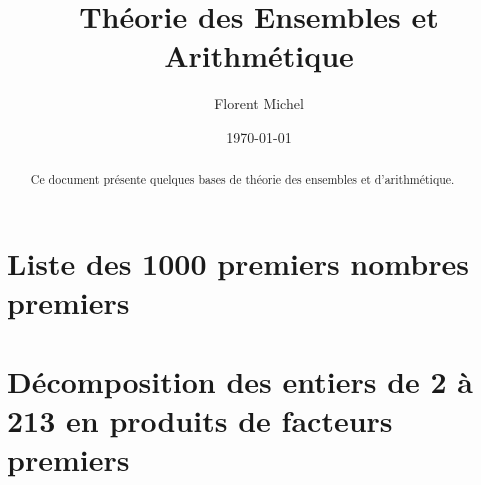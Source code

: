 
\usepackage{splitidx}
\newcommand{\aindex}[1]{#1\index{#1}} %
\makeindex
{}
 
\title{Théorie des Ensembles et Arithmétique}
\date{\today}
\author{%
Florent Michel \\ 
\Fstar} 

\newcommand{\inbox}[1]{\begin{tikzpicture}[baseline=-0.7ex, inner sep=0.5ex] \node[draw] {#1\vphantom{0123456789}}; \end{tikzpicture}}

 
\date{}
\maketitle 
\begin{abstract}
Ce document présente quelques bases de théorie des ensembles et d'arithmétique.
\end{abstract}
\bigskip
\renewcommand{\contentsname}{Table des matières}
\tableofcontents 

\clearpage



\clearpage



\clearpage



\clearpage

\appendix



\clearpage

\section{Liste des 1000 premiers nombres premiers} 

\noindent\textsf{}

\clearpage

\section{Décomposition des entiers de 2 à 213 en produits de facteurs premiers}

